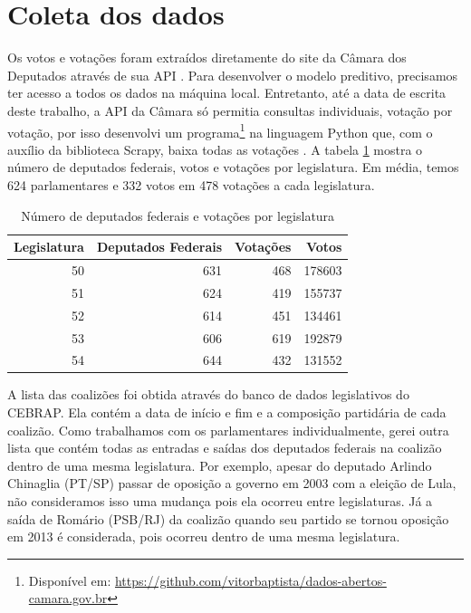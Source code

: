 \documentclass[a4paper,titlepage]{ppgi}\usepackage[]{graphicx}\usepackage[]{color}
\newenvironment{knitrout}{}{} %
\begin{document}
\section{Coleta dos dados}



Os votos e votações foram extraídos diretamente do site da Câmara dos
Deputados através de sua \gls{API} \cite{CamaraDosDeputados2015}. Para
desenvolver o modelo preditivo, precisamos ter acesso a todos os dados na
máquina local. Entretanto, até a data de escrita deste trabalho, a \gls{API} da
Câmara só permitia consultas individuais, votação por votação, por isso
desenvolvi um programa\footnote{Disponível em:
\url{https://github.com/vitorbaptista/dados-abertos-camara.gov.br}} na
linguagem Python que, com o auxílio da biblioteca Scrapy, baixa todas as
votações \cite{Python276,Scrapy}. A tabela
\ref{table:estatisticas-legislaturas} mostra o número de deputados federais,
votos e votações por legislatura. Em média, temos 624
parlamentares e 332 votos em
478 votações a cada legislatura.

\begin{table}
\centering
\begin{knitrout}
\color{fgcolor}
\begin{tabular}{r|r|r|r}
\hline
Legislatura & Deputados Federais & Votações & Votos\\
\hline
50 & 631 & 468 & 178603\\
\hline
51 & 624 & 419 & 155737\\
\hline
52 & 614 & 451 & 134461\\
\hline
53 & 606 & 619 & 192879\\
\hline
54 & 644 & 432 & 131552\\
\hline
\end{tabular}


\end{knitrout}
\caption{Número de deputados federais e votações por legislatura}
\label{table:estatisticas-legislaturas}
\end{table}

A lista das coalizões foi obtida através do banco de dados
legislativos do \gls{CEBRAP}. Ela contém a data de início e fim e a composição
partidária de cada coalizão. Como trabalhamos com os parlamentares
individualmente, gerei outra lista que contém todas as entradas e saídas dos
deputados federais na coalizão dentro de uma mesma legislatura. Por exemplo,
apesar do deputado Arlindo Chinaglia (PT/SP) passar de oposição a governo
em 2003 com a eleição de Lula, não consideramos isso uma mudança pois ela
ocorreu entre legislaturas. Já a saída de Romário (PSB/RJ) da coalizão quando
seu partido se tornou oposição em 2013 é considerada, pois ocorreu dentro de
uma mesma legislatura.
\end{document}

